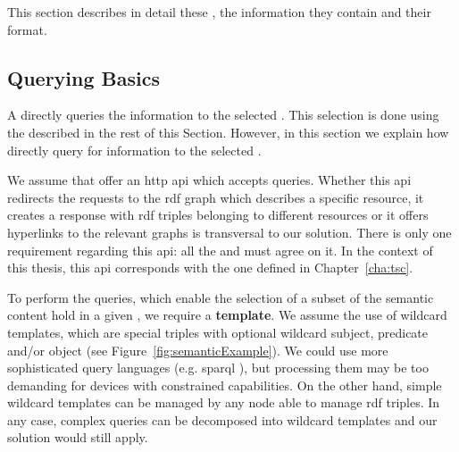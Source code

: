 This section describes in detail these \clues{}, the information they contain and their format.


\subsection{Querying Basics} %


A \consumer{} directly queries the information to the selected \providers{}.
This selection is done using the \clues{} described in the rest of this Section.
However, in this section we explain how \consumers{} directly query for information to the selected \providers{}.

We assume that \providers{} offer an \ac{http} \ac{api} which accepts queries. %
Whether this \ac{api} redirects the requests to the \ac{rdf} graph which describes a specific resource,
it creates a response with \ac{rdf} triples belonging to different resources or
it offers hyperlinks to the relevant graphs is transversal to our solution.
There is only one requirement regarding this \ac{api}: all the \consumers{} and \providers{} must agree on it.
In the context of this thesis, this \ac{api} corresponds with the one defined in Chapter~\ref{cha:tsc}.

To perform the queries, which enable the selection of a subset of the semantic content hold in a given \Space{}, we require a \textbf{template}.
We assume the use of wildcard templates, which are special triples with optional wildcard subject, predicate and/or object (see Figure~\ref{fig:semanticExample}). %
We could use more sophisticated query languages (e.g. \ac{sparql} ),
but processing them may be too demanding for devices with constrained capabilities.
On the other hand, simple wildcard templates can be managed by any node able to manage \ac{rdf} triples.
In any case, complex queries can be decomposed into wildcard templates and our solution would still apply.





